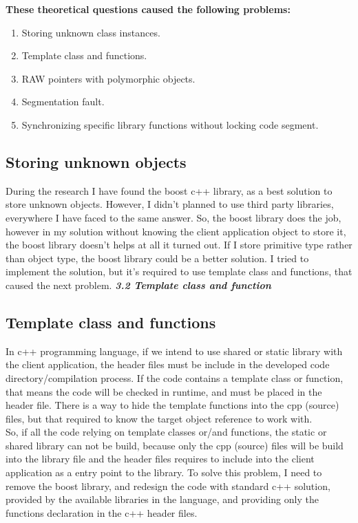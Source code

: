 \documentclass[12pt]{article}
\begin{document}
\textbf{These theoretical questions caused the following problems:}
\begin{enumerate}
\item Storing unknown class instances. 
\item Template class and functions.
\item RAW pointers with polymorphic objects.
\item Segmentation fault.
\item Synchronizing specific library functions without locking code segment.
\end{enumerate}
 
\subsection{Storing unknown objects}
During the research I have found the boost c++ library, as a best solution to store unknown objects. However, I didn't planned to use third party libraries, everywhere I have faced to the same answer. So, the boost library does the job, however in my solution without knowing the client application object to store it, the boost library doesn't helps at all it turned out. If I store primitive type rather than object type, the boost library could be a better solution. I tried to implement the solution, but it's required to use template class and functions, that caused the next problem. \textbf{\textit{3.2 Template class and function}}

\subsection{Template class and functions}
In c++ programming language, if we intend to use shared or static library with the client application, the header files must be include in the developed code directory/compilation process. If the code contains a template class or function, that means the code will be checked in runtime, and must be placed in the header file. There is a way to hide the template functions into the cpp (source) files, but that required to know the target object reference to work with.\\

So, if all the code relying on template classes or/and functions, the static or shared library can not be build, because only the cpp (source) files will be build into the library file and the header files requires to include into the client application as a entry point to the library. To solve this problem, I need to remove the boost library, and redesign the code with standard c++ solution, provided by the available libraries in the  language, and providing only the functions declaration in the c++ header files.
\end{document}
